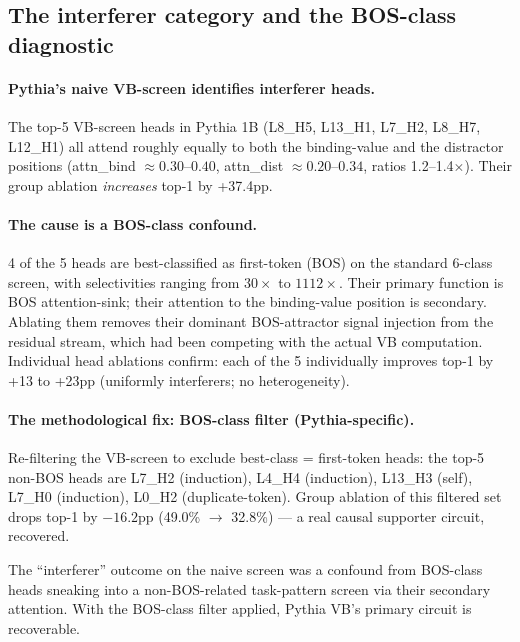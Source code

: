 \documentclass[11pt]{article}
\begin{document}
\subsection{The interferer category and the BOS-class diagnostic}

\paragraph{Pythia's naive VB-screen identifies interferer heads.}
The top-5 VB-screen heads in Pythia 1B (L8\_H5, L13\_H1, L7\_H2, L8\_H7, L12\_H1) all attend roughly equally to both the binding-value and the distractor positions (attn\_bind $\approx 0.30$--$0.40$, attn\_dist $\approx 0.20$--$0.34$, ratios 1.2--1.4$\times$). Their group ablation \emph{increases} top-1 by +37.4pp.

\paragraph{The cause is a BOS-class confound.}
4 of the 5 heads are best-classified as first-token (BOS) on the standard 6-class screen, with selectivities ranging from $30\times$ to $1112\times$. Their primary function is BOS attention-sink; their attention to the binding-value position is secondary. Ablating them removes their dominant BOS-attractor signal injection from the residual stream, which had been competing with the actual VB computation. Individual head ablations confirm: each of the 5 individually improves top-1 by +13 to +23pp (uniformly interferers; no heterogeneity).

\paragraph{The methodological fix: BOS-class filter (Pythia-specific).}
Re-filtering the VB-screen to exclude best-class = first-token heads: the top-5 non-BOS heads are L7\_H2 (induction), L4\_H4 (induction), L13\_H3 (self), L7\_H0 (induction), L0\_H2 (duplicate-token). Group ablation of this filtered set drops top-1 by $\boldsymbol{-16.2}$pp (49.0\% $\to$ 32.8\%) --- a real causal supporter circuit, recovered.

The ``interferer'' outcome on the naive screen was a confound from BOS-class heads sneaking into a non-BOS-related task-pattern screen via their secondary attention. With the BOS-class filter applied, Pythia VB's primary circuit is recoverable.
\end{document}
